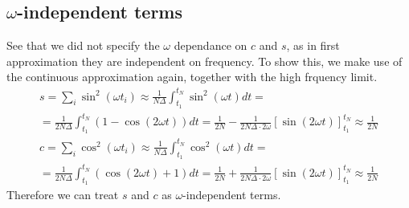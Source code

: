 \documentclass[a4paper,11pt,fleqn]{article}
\begin{document}
\subsection{$\omega$-independent terms}
See that we did not specify the $\omega$ dependance on $c$ and $s$, as 
in first approximation they are independent on frequency. To show this, 
we make use of the continuous approximation again, together with the high 
frquency limit. 
\begin{gather*}
    s = \sum_i \sin^2(\omega t_i)\approx \frac{1}{N\Delta}\int_{t_1}^{t_N} \sin^2(\omega t)dt =\\
    = \frac{1}{2N\Delta} \int_{t_1}^{t_N}(1-\cos(2\omega t))dt = \frac{1}{2N}-\frac{1}{2N \Delta \cdot 2\omega}[\sin(2\omega t)]_{t_1}^{t_N}\approx \frac{1}{2N}
\end{gather*}
\begin{gather*}
    c = \sum_i \cos^2(\omega t_i)\approx \frac{1}{N\Delta}\int_{t_1}^{t_N} \cos^2(\omega t)dt =\\
    = \frac{1}{2N\Delta} \int_{t_1}^{t_N}(\cos(2\omega t)+1)dt = \frac{1}{2N}+\frac{1}{2N \Delta \cdot 2\omega}[\sin(2\omega t)]_{t_1}^{t_N}\approx \frac{1}{2N}
\end{gather*}
Therefore we can treat $s$ and $c$ as $\omega$-independent terms.
\end{document}
